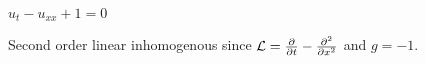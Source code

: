 $u_t-u_{xx} + 1 = 0$

\soln* Second order linear inhomogenous since $
    \mathcal{L} = \pdv{t} - \pdv[2]{x}
$ and $g = -1$.